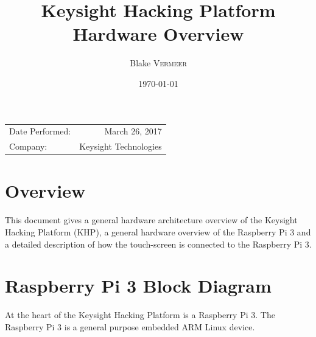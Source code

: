 \documentclass{article}
\title{Keysight Hacking Platform Hardware Overview} %
\author{Blake \textsc{Vermeer}} %
\date{\today} %
\begin{document}
\maketitle %

\begin{center}
\begin{tabular}{l r}
Date Performed: & March 26, 2017 \\ %
Company: & Keysight Technologies %
\end{tabular}
\end{center}


\section{Overview}

This document gives a general hardware architecture overview of the Keysight Hacking Platform (KHP), a general hardware overview of the Raspberry Pi 3 and a detailed description of how the touch-screen is connected to the Raspberry Pi 3.


\section{Raspberry Pi 3 Block Diagram}

At the heart of the Keysight Hacking Platform is a Raspberry Pi 3. The Raspberry Pi 3 is a general purpose embedded ARM Linux device. 
\end{document}
